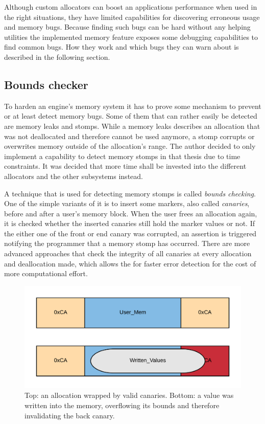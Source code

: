 Although custom allocators can boost an applications performance when used in the right situations, they have limited capabilities for discovering erroneous usage and memory bugs. Because finding such bugs can be hard without any helping utilities the implemented memory feature exposes some debugging capabilities to find common bugs. How they work and which bugs they can warn about is described in the following section.

\subsection{Bounds checker}

To harden an engine's memory system it has to prove some mechanism to prevent or at least detect memory bugs. Some of them that can rather easily be detected are memory leaks and stomps. While a memory leaks describes an allocation that was not deallocated and therefore cannot be used anymore, a stomp corrupts or overwrites memory outside of the allocation's range. The author decided to only implement a capability to detect memory stomps in that thesis due to time constraints. It was decided that more time shall be invested into the different allocators and the other subsystems instead.

A technique that is used for detecting memory stomps is called \textit{bounds checking}. One of the simple variants of it is to insert some markers, also called \textit{canaries}, before and after a user's memory block. When the user frees an allocation again, it is checked whether the inserted canaries still hold the marker values or not. If the either one of the front or end canary was corrupted, an assertion is triggered notifying the programmer that a memory stomp has occurred. There are more advanced approaches that check the integrity of all canaries at every allocation and deallocation made, which allows the for faster error detection for the cost of more computational effort. 

\begin{figure}[h!]
	\centering \includegraphics[width=\linewidth]{PICs/canaries.png}
	\caption{Top: an allocation wrapped by valid canaries. Bottom: a value was written into the memory, overflowing its bounds and therefore invalidating the back canary.}
	\label{fig:canaries}
\end{figure}


